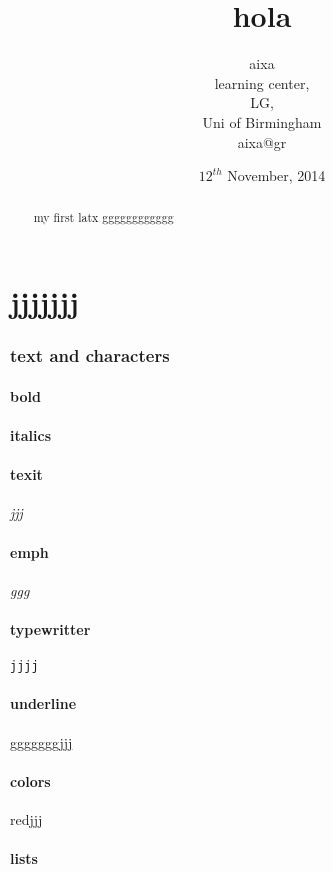 \documentclass[a4paper, 12pt] {article}
\begin{document}
\title{hola}
\date{$12^{th}$ November, 2014}
\author{aixa\\
learning center,\\
LG,\\
Uni of Birmingham\\
aixa@gr}
\maketitle
\newpage
\begin{abstract}my first latx gggggggggggg
\end{abstract}
\newpage
\tableofcontents
\newpage
\part{jjjjjjj}
\section{text and characters}
\subsection{bold}

\subsection{italics}
\subsection{texit}
\textit{jjj}
\subsection{emph}
\emph{ggg}
\subsection{typewritter}
\texttt{jjjj}
\subsection{underline}
ggggggg\underline{jjj}
\subsection{colors}
\begin{color}
{red}{jjj}
\end{color}
\subsection{lists}
\end{document}
